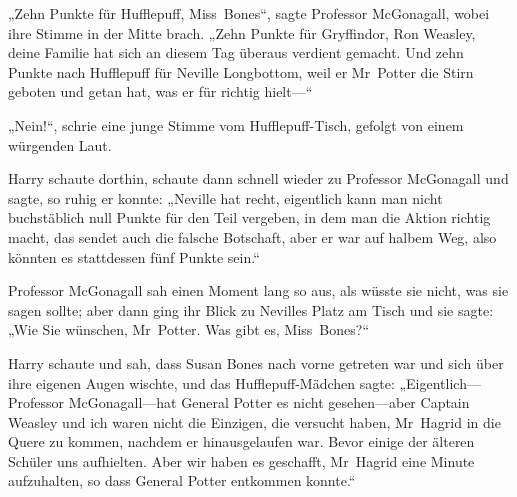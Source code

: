 „Zehn Punkte für Hufflepuff, Miss~Bones“, sagte Professor McGonagall, wobei ihre Stimme in der Mitte brach.
„Zehn Punkte für Gryffindor, Ron Weasley, deine Familie hat sich an diesem Tag überaus verdient gemacht. Und zehn Punkte nach Hufflepuff für Neville Longbottom, weil er Mr~Potter die Stirn geboten und getan hat, was er für richtig hielt—“

„Nein!“, schrie eine junge Stimme vom Hufflepuff-Tisch, gefolgt von einem würgenden Laut.

Harry schaute dorthin, schaute dann schnell wieder zu Professor McGonagall und sagte, so ruhig er konnte:
„Neville hat recht, eigentlich kann man nicht buchstäblich null Punkte für den Teil vergeben, in dem man die Aktion richtig macht, das sendet auch die falsche Botschaft, aber er war auf halbem Weg, also könnten es stattdessen fünf Punkte sein.“

Professor McGonagall sah einen Moment lang so aus, als wüsste sie nicht, was sie sagen sollte; aber dann ging ihr Blick zu Nevilles Platz am Tisch und sie sagte:
„Wie Sie wünschen, Mr~Potter. Was gibt es, Miss~Bones?“

Harry schaute und sah, dass Susan Bones nach vorne getreten war und sich über ihre eigenen Augen wischte, und das Hufflepuff-Mädchen sagte:
„Eigentlich—Professor McGonagall—hat General Potter es nicht gesehen—aber Captain Weasley und ich waren nicht die Einzigen, die versucht haben, Mr~Hagrid in die Quere zu kommen, nachdem er hinausgelaufen war. Bevor einige der älteren Schüler uns aufhielten. Aber wir haben es geschafft, Mr~Hagrid eine Minute aufzuhalten, so dass General Potter entkommen konnte.“

